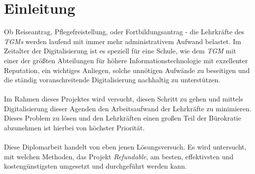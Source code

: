 \chapter{Einleitung} 
Ob Reiseantrag, Pflegefreistellung, oder Fortbildungsantrag - die Lehrkräfte des \textit{TGMs} werden laufend mit immer mehr administrativem Aufwand belastet. Im Zeitalter der Digitalisierung ist es speziell für eine Schule, wie dem \textit{TGM} mit einer der größten Abteilungen für höhere Informationstechnologie mit exzellenter Reputation, ein wichtiges Anliegen, solche unnötigen Aufwände zu beseitigen und die ständig voranschreitende Digitalisierung nachhaltig zu unterstützen.
~\\~\\
Im Rahmen dieses Projektes wird versucht, diesen Schritt zu gehen und mittels Digitalisierung dieser Agenden den Arbeitsaufwand der Lehrkräfte zu minimieren. Dieses Problem zu lösen und den Lehrkräften einen großen Teil der Bürokratie abzunehmen ist hierbei von höchster Priorität.
~\\~\\
Diese Diplomarbeit handelt von eben jenen Lösungsversuch. Es wird untersucht, mit welchen Methoden, das Projekt \textit{Refundable}, am besten, effektivsten und kostengünstigsten umgesetzt und durchgeführt werden kann.